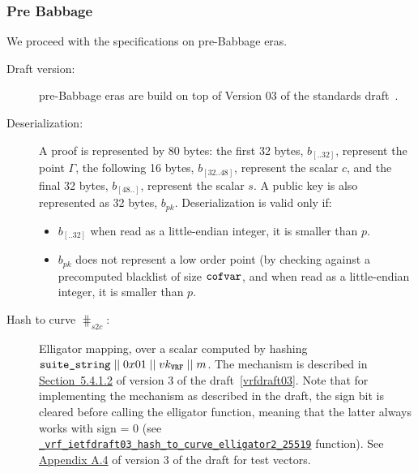 \subsubsection{Pre Babbage}
We proceed with the specifications on pre-Babbage eras.
\begin{description}
\item[Draft version:] pre-Babbage eras are build on top of Version 03 of the standards draft~\cite{vrfdraft03}.
\item[Deserialization:] A \vrf proof is represented by 80 bytes: the first 32 bytes, $b_{[..32]}$, represent the point $\Gamma$, the following 16 bytes, $b_{[32..48]}$, represent the scalar $c$, and the final 32 bytes, $b_{[48..]}$, represent the scalar $s$. A public key is also represented as 32 bytes, $b_{pk}$. Deserialization is valid only if:
\begin{itemize}
\item $b_{[..32]}$ when read as a little-endian integer, it is smaller than $p$.
\item $b_{pk}$ does not represent a low order point (by checking against a precomputed blacklist of size $\texttt{cofvar}$, and when read as a little-endian integer, it is smaller than $p$.
\end{itemize}
\item[Hash to curve $\hash_{s2c}$:] \sloppy Elligator mapping, over a scalar computed by
hashing $\texttt{suite\_string}\;||\; 0x01\;||\; vk_{\texttt{VRF}} \;||\; m$. The 
mechanism is described in \href{https://datatracker.ietf.org/doc/html/draft-irtf-cfrg-vrf-03#section-5.4.1.2}{Section~5.4.1.2} of version 3 of the draft~\ref{vrfdraft03}. Note that for 
implementing the mechanism as described in the draft, the sign bit is cleared before calling
the elligator function, meaning that the latter always works with sign = 0 (see \href{https://github.com/input-output-hk/libsodium/blob/tdammers/rebased-vrf/src/libsodium/crypto_vrf/ietfdraft03/convert.c#L84}{\texttt{\_vrf\_ietfdraft03\_hash\_to\_curve\_elligator2\_25519}}
function). See \href{https://datatracker.ietf.org/doc/html/draft-irtf-cfrg-vrf-03#appendix-A.4}{Appendix A.4} of version 3 of the draft for test vectors. 
\end{description}

